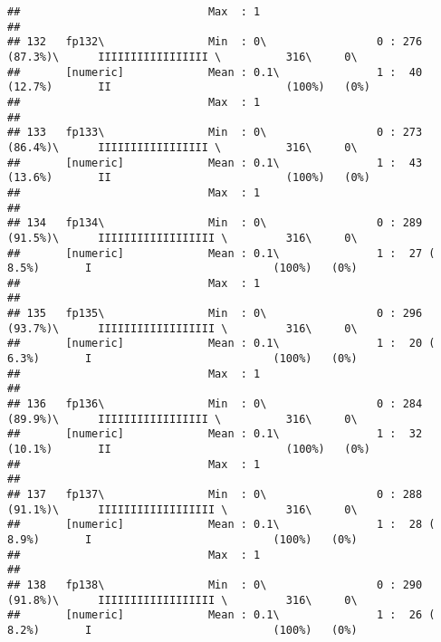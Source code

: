 \documentclass[]{article}
\begin{document}
\begin{verbatim}
##                             Max  : 1                                                                                       
## 
## 132   fp132\                Min  : 0\                 0 : 276 (87.3%)\      IIIIIIIIIIIIIIIII \          316\     0\       
##       [numeric]             Mean : 0.1\               1 :  40 (12.7%)       II                           (100%)   (0%)     
##                             Max  : 1                                                                                       
## 
## 133   fp133\                Min  : 0\                 0 : 273 (86.4%)\      IIIIIIIIIIIIIIIII \          316\     0\       
##       [numeric]             Mean : 0.1\               1 :  43 (13.6%)       II                           (100%)   (0%)     
##                             Max  : 1                                                                                       
## 
## 134   fp134\                Min  : 0\                 0 : 289 (91.5%)\      IIIIIIIIIIIIIIIIII \         316\     0\       
##       [numeric]             Mean : 0.1\               1 :  27 ( 8.5%)       I                            (100%)   (0%)     
##                             Max  : 1                                                                                       
## 
## 135   fp135\                Min  : 0\                 0 : 296 (93.7%)\      IIIIIIIIIIIIIIIIII \         316\     0\       
##       [numeric]             Mean : 0.1\               1 :  20 ( 6.3%)       I                            (100%)   (0%)     
##                             Max  : 1                                                                                       
## 
## 136   fp136\                Min  : 0\                 0 : 284 (89.9%)\      IIIIIIIIIIIIIIIII \          316\     0\       
##       [numeric]             Mean : 0.1\               1 :  32 (10.1%)       II                           (100%)   (0%)     
##                             Max  : 1                                                                                       
## 
## 137   fp137\                Min  : 0\                 0 : 288 (91.1%)\      IIIIIIIIIIIIIIIIII \         316\     0\       
##       [numeric]             Mean : 0.1\               1 :  28 ( 8.9%)       I                            (100%)   (0%)     
##                             Max  : 1                                                                                       
## 
## 138   fp138\                Min  : 0\                 0 : 290 (91.8%)\      IIIIIIIIIIIIIIIIII \         316\     0\       
##       [numeric]             Mean : 0.1\               1 :  26 ( 8.2%)       I                            (100%)   (0%)     

\end{verbatim}
\end{document}

